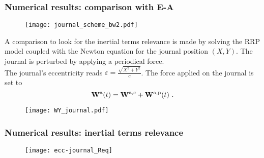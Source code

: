\documentclass[10pt,aspectratio=169]{beamer}
\begin{document}
\begin{frame}
\frametitle{Numerical results: comparison with E-A}
\begin{minipage}{0.5\linewidth}\vspace*{1.0cm}
	\begin{figure}
		\texttt{[image: journal\_scheme\_bw2.pdf]}
	\end{figure}
\end{minipage}%
\hspace*{0.5cm}
\begin{minipage}{0.5\linewidth}
A comparison to look for the inertial terms relevance is made by solving the RRP model coupled with the Newton equation for the journal position $(X,Y)$. The journal is perturbed by applying a periodical force.\\

The journal's eccentricity reads $\varepsilon=\frac{\sqrt{X^2+Y^2}}{c}$. The force applied on the journal is set to
\begin{equation*}
\mathbf{W}^\textnormal{a}(t)=\mathbf{W}^{\textnormal{a},\textnormal{c}}+\mathbf{W}^{\textnormal{a},\textnormal{p}}(t)~.
\end{equation*}
\end{minipage}
\vspace*{-0.2cm}
\begin{figure}
	\centering 
	\def\svgwidth{\textwidth}	
	\texttt{[image: WY\_journal.pdf]}
\end{figure}
\end{frame}  

\begin{frame}\vspace*{0.5cm}
\frametitle{Numerical results: inertial terms relevance}
\begin{figure}
	\centering 
	\def\svgwidth{\textwidth}	
	\texttt{[image: ecc-journal\_Req]}
\end{figure}
\end{frame}  
\end{document}
